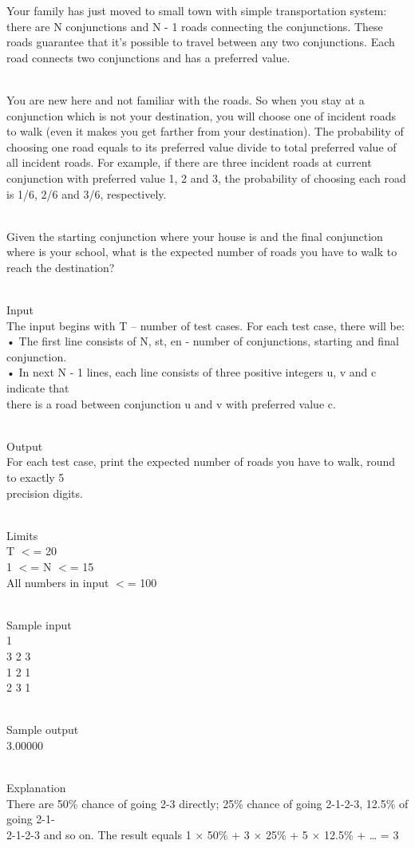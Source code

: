 



   Your family has just moved to small town with simple transportation system: there are N conjunctions and N - 1 roads connecting the conjunctions. These roads guarantee that it’s possible to travel between any two conjunctions. Each road connects two conjunctions and has a preferred value.  


\\   You are new here and not familiar with the roads. So when you stay at a conjunction which is not your destination, you will choose one of incident roads to walk (even it makes you get farther from your destination). The probability of choosing one road equals to its preferred value divide to total preferred value of all incident roads. For example, if there are three incident roads at current conjunction with preferred value 1, 2 and 3, the probability of choosing each road is 1/6, 2/6 and 3/6, respectively.  


\\   Given the starting conjunction where your house is and the final conjunction where is your school, what is the expected number of roads you have to walk to reach the destination?  


\\   Input   
\\   The input begins with T – number of test cases. For each test case, there will be:   
\\   • The first line consists of N, st, en - number of conjunctions, starting and final   
\\   conjunction.   
\\   • In next N - 1 lines, each line consists of three positive integers u, v and c indicate that   
\\   there is a road between conjunction u and v with preferred value c.  


\\   Output   
\\   For each test case, print the expected number of roads you have to walk, round to exactly 5   
\\   precision digits.  


\\   Limits   
\\   T $<$= 20   
\\   1 $<$= N $<$= 15   
\\   All numbers in input $<$= 100  


\\   Sample input   
\\   1   
\\   3 2 3   
\\   1 2 1   
\\   2 3 1  


\\   Sample output   
\\   3.00000  


\\   Explanation   
\\   There are 50\% chance of going 2-3 directly; 25\% chance of going 2-1-2-3, 12.5\% of going 2-1-   
\\   2-1-2-3 and so on. The result equals 1 × 50\% + 3 × 25\% + 5 × 12.5\% + … = 3  